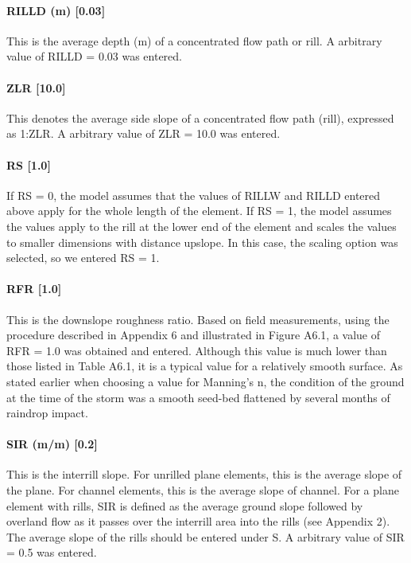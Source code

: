 \paragraph{RILLD (m) [0.03]}
This is the average depth (m) of a concentrated flow path or rill. A arbitrary value of RILLD = 0.03 was entered.
 
\paragraph{ZLR [10.0]}
This denotes the average side slope of a concentrated flow path (rill), expressed as 1:ZLR.  A arbitrary value of ZLR = 10.0 was entered.
 
\paragraph{RS [1.0]}
If RS = 0, the model assumes that the values of RILLW and RILLD entered above apply for the whole length of the element. If RS = 1, the model assumes the values apply to the rill at the lower end of the element and scales the values to smaller dimensions with distance upslope. In this case, the scaling option was selected, so we entered RS = 1.
 
\paragraph{RFR [1.0]}
This is the downslope roughness ratio. Based on field measurements, using the procedure described in Appendix 6 and illustrated in Figure A6.1, a value of RFR = 1.0 was obtained and entered.
Although this value is much lower than those listed in Table A6.1, it is a typical value for a relatively smooth surface. As stated earlier when choosing a value for Manning's n, the condition of the ground at the time of the storm was a smooth seed-bed flattened by several months of raindrop impact.
 
\paragraph{SIR (m/m) [0.2]}
This is the interrill slope. For unrilled plane elements, this is the average slope of the plane. For channel elements, this is the average slope of channel. For a plane element with rills, SIR is defined as the average ground slope followed by overland flow as it passes over the interrill area into the rills (see Appendix 2). The average slope of the rills should be entered under S. A arbitrary value of SIR = 0.5 was entered.
 

